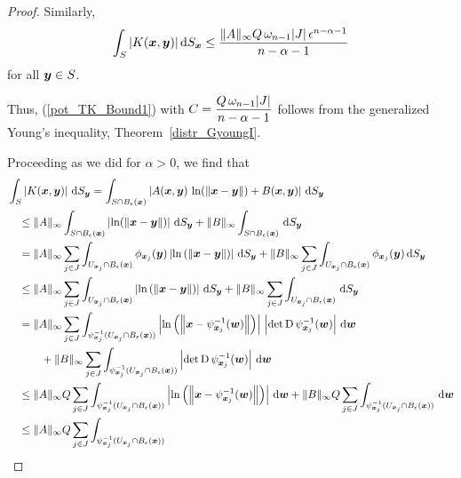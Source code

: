 \begin{proof}
Similarly,
\[
\int_S | K({\bm{x}},{\bm{y}}) | \,\mathrm{d}{S}_{{\bm{x}}} \leq
\frac{\|A\|_\infty Q\, \omega_{n-1} |J|\, \epsilon^{n-\alpha-1}}{n-\alpha-1}
\]
for all ${\bm{y}} \in S$.

Thus, (\ref{pot_TK_Bound1}) with
$\displaystyle C = \frac{Q\, \omega_{n-1} |J|}{n-\alpha-1}$
follows from the generalized Young's inequality,
Theorem~\ref{distr_GyoungI}.

  Proceeding as we did for $\alpha > 0$, we find
that
\begin{align*}
&\int_S \left| K(\VEC{x},\VEC{y}) \right| \dss{S}{y}
= \int_{S \cap B_\epsilon(\VEC{x})}
\left| A(\VEC{x},\VEC{y}) \,\ln(\|\VEC{x}-\VEC{y}\|) +
B(\VEC{x},\VEC{y}) \right| \dss{S}{y} \\
&\quad \leq \|A\|_\infty \int_{S \cap B_\epsilon(\VEC{x})}
\left|\ln(\|\VEC{x}-\VEC{y}\|) \right| \dss{S}{y} +
\|B\|_\infty \int_{S \cap B_\epsilon(\VEC{x})}\dss{S}{y} \\
&\quad = \|A\|_\infty\sum_{j\in J}
\int_{U_{\VEC{x}_j}\cap B_\epsilon(\VEC{x})}
\phi_{\VEC{x}_j}(\VEC{y})
\left| \ln\left( \left\| \VEC{x} - \VEC{y} \right\|\right) \right|
\dss{S}{\VEC{y}} + \|B\|_\infty \sum_{j\in J}
\int_{U_{\VEC{x}_j}\cap B_\epsilon(\VEC{x})} \phi_{\VEC{x}_j}(\VEC{y})
\dss{S}{\VEC{y}} \\
&\quad \leq \|A\|_\infty\sum_{j\in J}
\int_{U_{\VEC{x}_j}\cap B_\epsilon(\VEC{x})}
\left| \ln\left( \left\| \VEC{x} - \VEC{y} \right\|\right) \right|
\dss{S}{\VEC{y}} + \|B\|_\infty \sum_{j\in J}
\int_{U_{\VEC{x}_j}\cap B_\epsilon(\VEC{x})}\dss{S}{\VEC{y}} \\
&\quad = \|A\|_\infty\sum_{j\in J}
\int_{\psi_{\VEC{x}_j}^{-1}(U_{\VEC{x}_j}\cap B_\epsilon(\VEC{x}))}
\left| \ln\left( \left\| \VEC{x} - \psi_{\VEC{x}_j}^{-1}(\VEC{w}) 
\right\|\right) \right|\, \left|\det \diff \psi_{\VEC{x}_j}^{-1}(\VEC{w}) \right|
\dx{\VEC{w}} \\
&\quad \qquad + \|B\|_\infty \sum_{j\in J}
\int_{\psi_{\VEC{x}_j}^{-1}(U_{\VEC{x}_j}\cap B_\epsilon(\VEC{x}))}
\left|\det \diff \psi_{\VEC{x}_j}^{-1}(\VEC{w}) \right| \dx{\VEC{w}} \\
&\quad \leq \|A\|_\infty Q \sum_{j\in J}
\int_{\psi_{\VEC{x}_j}^{-1}(U_{\VEC{x}_j}\cap B_\epsilon(\VEC{x}))}
\left| \ln\left( \left\| \VEC{x} - \psi_{\VEC{x}_j}^{-1}(\VEC{w}) 
\right\|\right) \right| \dx{\VEC{w}}
+ \|B\|_\infty Q \sum_{j\in J}
\int_{\psi_{\VEC{x}_j}^{-1}(U_{\VEC{x}_j}\cap B_\epsilon(\VEC{x}))} \dx{\VEC{w}} \\
&\quad \leq \|A\|_\infty Q \sum_{j\in J}
\int_{\psi_{\VEC{x}_j}^{-1}(U_{\VEC{x}_j}\cap B_\epsilon(\VEC{x}))}

\end{align*}
\end{proof}
